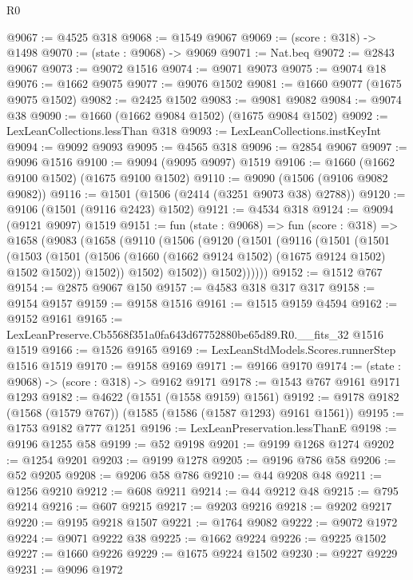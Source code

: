 \begin{lexlean}{R0}
\begin{coremodule}
@9067 := @4525 @318
@9068 := @1549 @9067
@9069 := (score : @318) -> @1498
@9070 := (state : @9068) -> @9069
@9071 := Nat.beq
@9072 := @2843 @9067
@9073 := @9072 @1516
@9074 := @9071 @9073
@9075 := @9074 @18
@9076 := @1662 @9075
@9077 := @9076 @1502
@9081 := @1660 @9077 (@1675 @9075 @1502)
@9082 := @2425 @1502
@9083 := @9081 @9082
@9084 := @9074 @38
@9090 := @1660 (@1662 @9084 @1502) (@1675 @9084 @1502)
@9092 := LexLeanCollections.lessThan @318
@9093 := LexLeanCollections.instKeyInt
@9094 := @9092 @9093
@9095 := @4565 @318
@9096 := @2854 @9067
@9097 := @9096 @1516
@9100 := @9094 (@9095 @9097) @1519
@9106 := @1660 (@1662 @9100 @1502) (@1675 @9100 @1502)
@9110 := @9090 (@1506 (@9106 @9082 @9082))
@9116 := @1501 (@1506 (@2414 (@3251 @9073 @38) @2788))
@9120 := @9106 (@1501 (@9116 @2423) @1502)
@9121 := @4534 @318
@9124 := @9094 (@9121 @9097) @1519
@9151 := fun (state : @9068) =>
  fun (score : @318) =>
  @1658
    (@9083
      (@1658
        (@9110
          (@1506
            (@9120
              (@1501
                (@9116
                  (@1501
                    (@1501
                      (@1503
                        (@1501
                          (@1506 (@1660 (@1662 @9124 @1502) (@1675 @9124 @1502) @1502 @1502))
                          @1502))
                      @1502)
                    @1502))
                @1502))))))
@9152 := @1512 @767
@9154 := @2875 @9067 @150
@9157 := @4583 @318 @317 @317
@9158 := @9154 @9157
@9159 := @9158 @1516
@9161 := @1515 @9159 @4594
@9162 := @9152 @9161
@9165 := LexLeanPreserve.Cb5568f351a0fa643d67752880be65d89.R0.__fits_32 @1516 @1519
@9166 := @1526 @9165
@9169 := LexLeanStdModels.Scores.runnerStep @1516 @1519
@9170 := @9158 @9169
@9171 := @9166 @9170
@9174 := (state : @9068) -> (score : @318) -> @9162 @9171
@9178 := @1543 @767 @9161 @9171 @1293
@9182 := @4622 (@1551 (@1558 @9159) @1561)
@9192 := @9178 @9182 (@1568 (@1579 @767)) (@1585 (@1586 (@1587 @1293) @9161 @1561))
@9195 := @1753 @9182 @777 @1251
@9196 := LexLeanPreservation.lessThanE
@9198 := @9196 @1255 @58
@9199 := @52 @9198
@9201 := @9199 @1268 @1274
@9202 := @1254 @9201
@9203 := @9199 @1278
@9205 := @9196 @786 @58
@9206 := @52 @9205
@9208 := @9206 @58 @786
@9210 := @44 @9208 @48
@9211 := @1256 @9210
@9212 := @608 @9211
@9214 := @44 @9212 @48
@9215 := @795 @9214
@9216 := @607 @9215
@9217 := @9203 @9216
@9218 := @9202 @9217
@9220 := @9195 @9218 @1507
@9221 := @1764 @9082
@9222 := @9072 @1972
@9224 := @9071 @9222 @38
@9225 := @1662 @9224
@9226 := @9225 @1502
@9227 := @1660 @9226
@9229 := @1675 @9224 @1502
@9230 := @9227 @9229
@9231 := @9096 @1972

\end{coremodule}
\end{lexlean}
